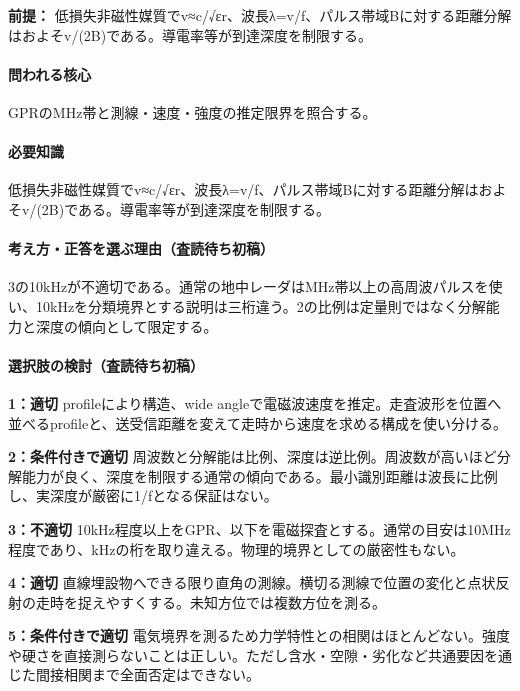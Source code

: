 \noindent\textbf{前提：} 低損失非磁性媒質でv≈c/√εr、波長λ=v/f、パルス帯域Bに対する距離分解はおよそv/(2B)である。導電率等が到達深度を制限する。\par

\paragraph{問われる核心} GPRのMHz帯と測線・速度・強度の推定限界を照合する。

\paragraph{必要知識} 低損失非磁性媒質でv≈c/√εr、波長λ=v/f、パルス帯域Bに対する距離分解はおよそv/(2B)である。導電率等が到達深度を制限する。

\paragraph{考え方・正答を選ぶ理由（査読待ち初稿）} 3の10kHzが不適切である。通常の地中レーダはMHz帯以上の高周波パルスを使い、10kHzを分類境界とする説明は三桁違う。2の比例は定量則ではなく分解能力と深度の傾向として限定する。

\paragraph{選択肢の検討（査読待ち初稿）}\mbox{}\par

\noindent\textbf{1：適切} profileにより構造、wide angleで電磁波速度を推定。走査波形を位置へ並べるprofileと、送受信距離を変えて走時から速度を求める構成を使い分ける。\par

\noindent\textbf{2：条件付きで適切} 周波数と分解能は比例、深度は逆比例。周波数が高いほど分解能力が良く、深度を制限する通常の傾向である。最小識別距離は波長に比例し、実深度が厳密に1/fとなる保証はない。\par

\noindent\textbf{3：不適切} 10kHz程度以上をGPR、以下を電磁探査とする。通常の目安は10MHz程度であり、kHzの桁を取り違える。物理的境界としての厳密性もない。\par

\noindent\textbf{4：適切} 直線埋設物へできる限り直角の測線。横切る測線で位置の変化と点状反射の走時を捉えやすくする。未知方位では複数方位を測る。\par

\noindent\textbf{5：条件付きで適切} 電気境界を測るため力学特性との相関はほとんどない。強度や硬さを直接測らないことは正しい。ただし含水・空隙・劣化など共通要因を通じた間接相関まで全面否定はできない。\par


